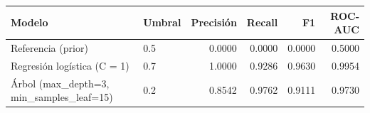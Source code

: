 \begin{tabular}{llrrrr}
\toprule
Modelo & Umbral & Precisión & Recall & F1 & ROC-AUC \\
\midrule
Referencia (prior) & 0.5 & 0.0000 & 0.0000 & 0.0000 & 0.5000 \\
Regresión logística (C = 1) & 0.7 & 1.0000 & 0.9286 & 0.9630 & 0.9954 \\
Árbol (max\_depth=3, min\_samples\_leaf=15) & 0.2 & 0.8542 & 0.9762 & 0.9111 & 0.9730 \\
\bottomrule
\end{tabular}

